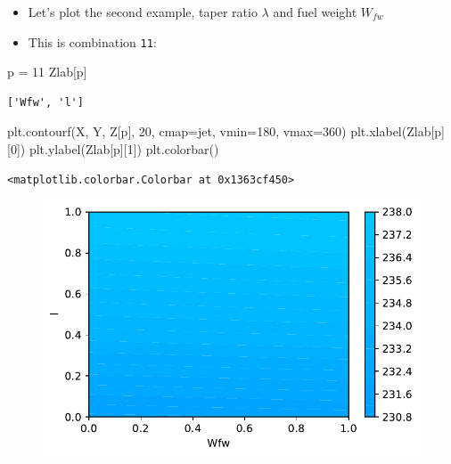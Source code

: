 \documentclass[
  letterpaper,
  DIV=11,
  numbers=noendperiod]{scrreprt}
\newenvironment{Shaded}{\begin{snugshade}}{\end{snugshade}}
\newcommand{\DecValTok}[1]{\textcolor[rgb]{0.68,0.00,0.00}{#1}}
\newcommand{\NormalTok}[1]{\textcolor[rgb]{0.00,0.23,0.31}{#1}}
\newcommand{\OperatorTok}[1]{\textcolor[rgb]{0.37,0.37,0.37}{#1}}
\newcommand{\StringTok}[1]{\textcolor[rgb]{0.13,0.47,0.30}{#1}}
\providecommand{\tightlist}{%
  \setlength{\itemsep}{0pt}\setlength{\parskip}{0pt}}\usepackage{longtable,booktabs,array}
\begin{document}
\begin{itemize}
\tightlist
\item
  Let's plot the second example, taper ratio \(\lambda\) and fuel weight
  \(W_{fw}\)
\item
  This is combination \texttt{11}:
\end{itemize}

\begin{Shaded}
\begin{Highlighting}[]
\NormalTok{p }\OperatorTok{=} \DecValTok{11}
\NormalTok{Zlab[p]}
\end{Highlighting}
\end{Shaded}

\begin{verbatim}
['Wfw', 'l']
\end{verbatim}

\begin{Shaded}
\begin{Highlighting}[]
\NormalTok{plt.contourf(X, Y, Z[p], }\DecValTok{20}\NormalTok{, cmap}\OperatorTok{=}\StringTok{\textquotesingle{}jet\textquotesingle{}}\NormalTok{, vmin}\OperatorTok{=}\DecValTok{180}\NormalTok{, vmax}\OperatorTok{=}\DecValTok{360}\NormalTok{)}
\NormalTok{plt.xlabel(Zlab[p][}\DecValTok{0}\NormalTok{])}
\NormalTok{plt.ylabel(Zlab[p][}\DecValTok{1}\NormalTok{])}
\NormalTok{plt.colorbar()}
\end{Highlighting}
\end{Shaded}

\begin{verbatim}
<matplotlib.colorbar.Colorbar at 0x1363cf450>
\end{verbatim}

\begin{figure}[H]

{\centering \includegraphics{002_awwe_files/figure-pdf/cell-13-output-2.pdf}

}

\end{figure}
\end{document}
